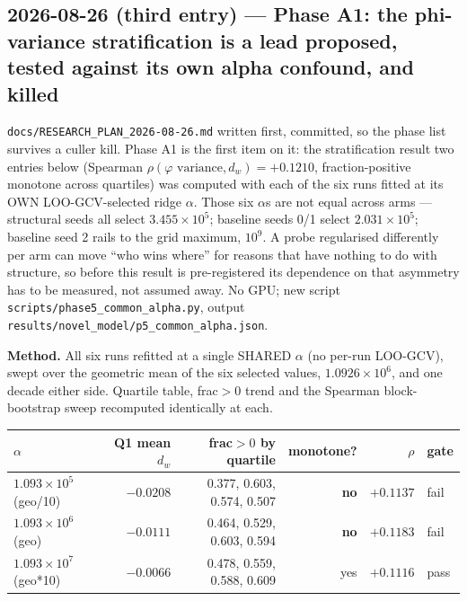 \documentclass[11pt,a4paper]{article}
\newcommand{\code}[1]{\texttt{\small #1}}
\begin{document}
\subsection*{2026-08-26 (third entry) --- Phase A1: the phi-variance
stratification is a lead proposed, tested against its own alpha confound, and
killed}

\code{docs/RESEARCH\_PLAN\_2026-08-26.md} written first, committed, so the
phase list survives a culler kill. Phase A1 is the first item on it: the
stratification result two entries below (Spearman
$\rho(\varphi\text{ variance}, d_w) = +0.1210$, fraction-positive monotone
across quartiles) was computed with each of the six runs fitted at its OWN
LOO-GCV-selected ridge $\alpha$. Those six $\alpha$s are not equal across
arms --- structural seeds all select $3.455\times10^{5}$; baseline seeds 0/1
select $2.031\times10^{5}$; baseline seed 2 rails to the grid maximum,
$10^{9}$. A probe regularised differently per arm can move ``who wins where''
for reasons that have nothing to do with structure, so before this result is
pre-registered its dependence on that asymmetry has to be measured, not
assumed away. No GPU; new script \code{scripts/phase5\_common\_alpha.py},
output \code{results/novel\_model/p5\_common\_alpha.json}.

\textbf{Method.} All six runs refitted at a single SHARED $\alpha$ (no
per-run LOO-GCV), swept over the geometric mean of the six selected values,
$1.0926\times10^{6}$, and one decade either side. Quartile table, frac$>0$
trend and the Spearman block-bootstrap sweep recomputed identically at each.

\begin{center}
\begin{tabular}{lrrrrl}
\toprule
$\alpha$ & Q1 mean $d_w$ & frac$>0$ by quartile & monotone? & $\rho$ & gate \\
\midrule
$1.093\times10^{5}$ (geo/10)  & $-0.0208$ & 0.377, 0.603, 0.574, 0.507 & \textbf{no} & $+0.1137$ & fail \\
$1.093\times10^{6}$ (geo)     & $-0.0111$ & 0.464, 0.529, 0.603, 0.594 & \textbf{no} & $+0.1183$ & fail \\
$1.093\times10^{7}$ (geo*10)  & $-0.0066$ & 0.478, 0.559, 0.588, 0.609 & yes         & $+0.1116$ & pass \\
\bottomrule
\end{tabular}
\end{center}
\end{document}
